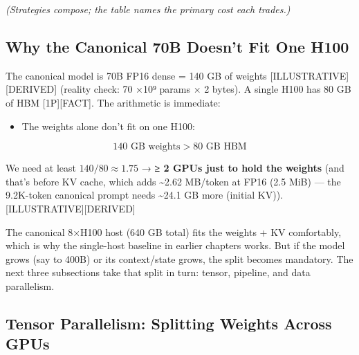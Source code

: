 \emph{(Strategies compose; the table names the primary cost each
trades.)}

\label{worked-example}


\subsection{Why the Canonical 70B Doesn't Fit One
H100}\label{why-the-canonical-70b-doesnt-fit-one-h100}

The canonical model is 70B FP16 dense = 140 GB of weights
\mbox{{[}ILLUSTRATIVE{]}}\hspace{0pt}\mbox{{[}DERIVED{]}} (reality check: 70 ×10⁹ params × 2
bytes). A single H100 has 80 GB of HBM \mbox{{[}1P{]}}\hspace{0pt}\mbox{{[}FACT{]}}. The
arithmetic is immediate:

\begin{itemize}
\tightlist
\item
  The weights alone don't fit on one H100:
\end{itemize}

\[
140 \text{ GB weights} > 80 \text{ GB HBM}
\]

We need at least \(140 / 80 \approx 1.75\) → \textbf{≥ 2 GPUs just to
hold the weights} (and that's before KV cache, which adds
\textasciitilde2.62 MB/token at FP16 (2.5 MiB) --- the 9.2K-token
canonical prompt needs \textasciitilde24.1 GB more (initial KV)).
\mbox{{[}ILLUSTRATIVE{]}}\hspace{0pt}\mbox{{[}DERIVED{]}}

The canonical 8×H100 host (640 GB total) fits the weights + KV
comfortably, which is why the single-host baseline in earlier chapters
works. But if the model grows (say to 400B) or its context/state grows,
the split becomes mandatory. The next three subsections take that split
in turn: tensor, pipeline, and data parallelism.

\subsection{Tensor Parallelism: Splitting Weights Across
GPUs}\label{tensor-parallelism-splitting-weights-across-gpus}

